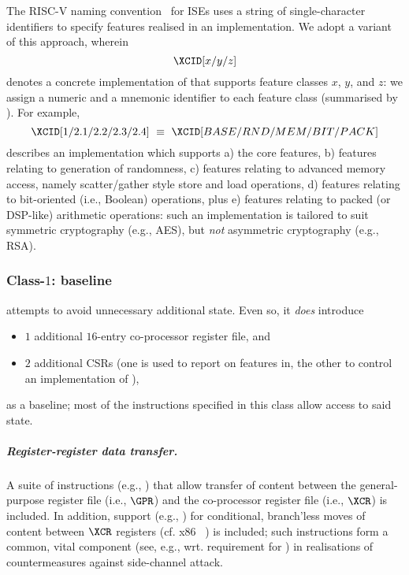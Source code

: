 \noindent
The RISC-V naming convention~\cite[Section 22]{SCARV:RV:ISA:I:17} for ISEs
uses a string of single-character identifiers to specify features realised
in an implementation.  We adopt a variant of this approach, wherein
\[
\XCID[x/y/z]
\]
denotes a concrete implementation of \XCID that supports feature classes 
$x$, $y$, and $z$: we assign a numeric and a mnemonic identifier to each
feature class (summarised by ).  For example,
\[
\XCID[1/2.1/2.2/2.3/2.4] ~\equiv~ \XCID[BASE/RND/MEM/BIT/PACK]
\]
describes an implementation which supports
a) the core features,
b) features relating to generation of randomness,
c) features relating to advanced memory access, namely scatter/gather
   style store and load operations,
d) features relating to bit-oriented (i.e., Boolean) operations,
   plus
e) features relating to packed (or DSP-like) arithmetic operations:
such an implementation is tailored to suit symmetric cryptography (e.g.,
AES), but {\em not} asymmetric cryptography (e.g., RSA).


\subsubsection{Class-$1$:   baseline}
\label{sec:bg:feature:1}

\XCID attempts to avoid unnecessary additional state.  Even so, it {\em does}
introduce

\begin{itemize}
\item $1$ additional $16$-entry co-processor register file,
      and
\item $2$ additional CSRs 
      (one is used to report on features in, the other to control an implementation of \XCID),
\end{itemize}

\noindent
as a baseline; most of the instructions specified in this class allow access 
to said state.

\subparagraph{Register-register data transfer.}

A suite of instructions
(e.g., )
that allow 
transfer of content between
the general-purpose register file (i.e., $\GPR$)
and
the    co-processor register file (i.e., $\XCR$)
is included.
In addition, support 
(e.g., )
for conditional, branch'less moves of content between $\XCR$ registers 
(cf. x86 ~\cite[Page 3-149--3-152]{SCARV:X86:2:18})
is included; such instructions form a common, vital component
(see, e.g., \cite[Section 5]{SCARV:RFC:7748} wrt. requirement for )
in realisations of countermeasures against side-channel attack.

